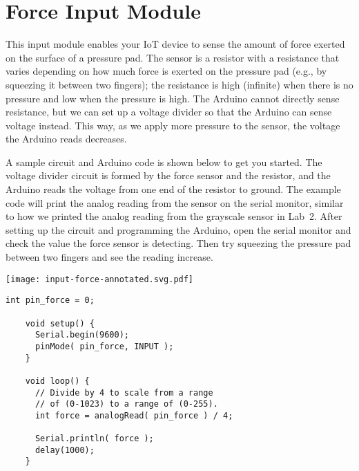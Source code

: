 
\clearpage
\section{Force Input Module}
\label{sec-input-force}


This input module enables your IoT device to sense the amount of force
exerted on the surface of a pressure pad. The sensor is a resistor with
a resistance that varies depending on how much force is exerted on the
pressure pad (e.g., by squeezing it between two fingers); the resistance
is high (infinite) when there is no pressure and low when the pressure
is high. The Arduino cannot directly sense resistance, but we can set up
a voltage divider so that the Arduino can sense voltage instead. This
way, as we apply more pressure to the sensor, the voltage the Arduino
reads decreases.

A sample circuit and Arduino code is shown below to get you started.
The voltage divider circuit is formed by the force sensor and the
 resistor, and the Arduino reads the voltage from one end
of the resistor to ground. The example code will print the analog
reading from the sensor on the serial monitor, similar to how we printed
the analog reading from the grayscale sensor in Lab~2. After setting up
the circuit and programming the Arduino, open the serial monitor and
check the value the force sensor is detecting. Then try squeezing the
pressure pad between two fingers and see the reading increase.

\vspace{0.1in}
\begin{minipage}[t]{0.49\tw}
  \vspace{0pt}

  \texttt{[image: input-force-annotated.svg.pdf]}
\end{minipage}
\hfill
\begin{minipage}[t]{0.49\tw}
  \vspace{0.1in}
  \begin{Verbatim}[gobble=3,fontsize=\small]
    int pin_force = 0;

    void setup() {
      Serial.begin(9600);
      pinMode( pin_force, INPUT );
    }

    void loop() {
      // Divide by 4 to scale from a range
      // of (0-1023) to a range of (0-255).
      int force = analogRead( pin_force ) / 4;

      Serial.println( force );
      delay(1000);
    }
  \end{Verbatim}
\end{minipage}
\vspace{0.1in}

